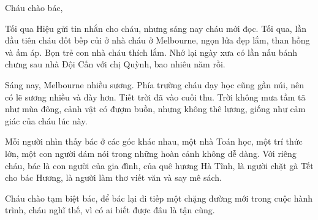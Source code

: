 Cháu chào bác,

Tối qua Hiệu gửi tin nhắn cho cháu, nhưng sáng nay cháu mới đọc. Tối qua, lần đầu tiên cháu đốt bếp củi ở nhà cháu ở Melbourne, ngọn lửa đẹp lắm, than hồng và ấm áp. Bọn trẻ con nhà cháu thích lắm. Nhớ lại ngày xưa có lần nấu bánh chưng sau nhà Đội Cấn với chị Quỳnh, bao nhiêu năm rồi.

Sáng nay, Melbourne nhiều sương. Phía trường cháu dạy học cũng gần núi, nên có lẽ sương nhiều và dày hơn. Tiết trời đã vào cuối thu. Trời không mưa tầm tã như mùa đông, cảnh vật có đượm buồn, nhưng không thê lương, giống như cảm giác của cháu lúc này.

Mỗi người nhìn thấy bác ở các góc khác nhau, một nhà Toán học, một trí thức lớn, một con người dám nói trong những hoàn cảnh không dễ dàng. Với riêng cháu, bác là con người của gia đình, của quê hương Hà Tĩnh, là người chặt gà Tết cho bác Hương, là người làm thơ viết văn và say mê sách. 

Cháu chào tạm biệt bác, để bác lại đi tiếp một chặng đường mới trong cuộc hành trình, cháu nghĩ thế, vì có ai biết được đâu là tận cùng.